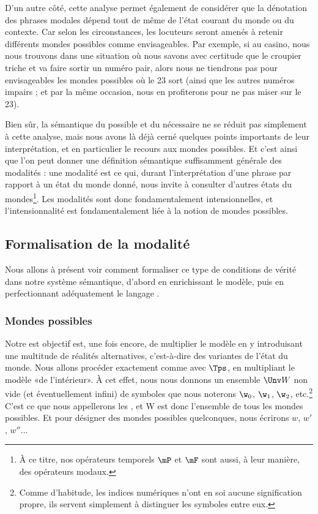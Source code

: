 D'un autre côté, cette analyse permet également de considérer que la dénotation des phrases modales dépend tout de même de l'état courant du monde ou du contexte. Car selon les circonstances, les locuteurs seront amenés à retenir différents mondes possibles comme envisageables. Par exemple, si au casino, nous nous trouvons dans une situation où nous savons avec certitude que le croupier triche et va faire sortir un numéro pair, alors nous ne tiendrons pas pour envisageables les mondes possibles où le 23 sort (ainsi que les autres numéros impairs ; et par la même occasion, nous en profiterons pour ne pas miser  sur le 23).

Bien sûr, la sémantique du possible et du nécessaire ne se réduit pas simplement à cette analyse, mais nous avons là déjà cerné quelques points importants de leur interprétation, et en particulier le recours aux mondes possibles.  Et c'est ainsi que l'on peut donner une définition sémantique suffisamment générale des modalités : une modalité est ce qui, durant l'interprétation d'une phrase par rapport à un état du monde donné, nous invite à consulter d'autres états du mondes\footnote{À ce titre, nos opérateurs temporels $\mP$ et $\mF$ sont aussi, à leur manière, des opérateurs modaux.}. Les modalités sont donc fondamentalement intensionnelles, et l'intensionnalité est fondamentalement liée à la notion de mondes possibles.


\subsection{Formalisation de la modalité}

Nous allons à présent voir comment formaliser  ce type de
conditions de vérité dans notre système sémantique, d'abord en
enrichissant le modèle, puis en perfectionnant adéquatement le langage
{\LO}.  



\subsubsection{Mondes possibles}
\label{sss:mondepossible}

Notre est objectif est, une fois encore, de multiplier le modèle en y introduisant une multitude de réalités alternatives, c'est-à-dire des variantes de l'état du monde.
Nous allons procéder exactement comme avec $\Tps$, en multipliant le modèle «de l'intérieur». 
À cet effet, nous nous donnons un ensemble $\Unv W$ non vide (et éventuellement infini) de symboles que nous noterons $\w_0$, $\w_1$, $\w_2$, etc.\footnote{Comme d'habitude, les indices numériques n'ont en soi aucune signification propre, ils servent simplement à distinguer les symboles entre eux.} C'est ce que nous appellerons les , et \Unv W est donc l'ensemble de tous les mondes possibles. Et pour désigner des mondes possibles quelconques, nous écrirons $w$, $w'$, $w''$...

